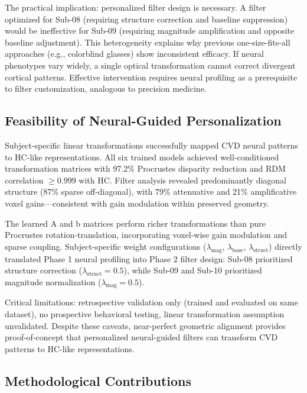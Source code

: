 \documentclass[12pt,a4paper]{article}
\begin{document}
The practical implication: personalized filter design is necessary. A filter optimized for Sub-08 (requiring structure correction and baseline suppression) would be ineffective for Sub-09 (requiring magnitude amplification and opposite baseline adjustment). This heterogeneity explains why previous one-size-fits-all approaches (e.g., colorblind glasses) show inconsistent efficacy. If neural phenotypes vary widely, a single optical transformation cannot correct divergent cortical patterns. Effective intervention requires neural profiling as a prerequisite to filter customization, analogous to precision medicine.

\subsection{Feasibility of Neural-Guided Personalization}

Subject-specific linear transformations successfully mapped CVD neural patterns to HC-like representations. All six trained models achieved well-conditioned transformation matrices with 97.2\% Procrustes disparity reduction and RDM correlation $\geq 0.999$ with HC. Filter analysis revealed predominantly diagonal structure (87\% sparse off-diagonal), with 79\% attenuative and 21\% amplificative voxel gains—consistent with gain modulation within preserved geometry.

The learned A and b matrices perform richer transformations than pure Procrustes rotation-translation, incorporating voxel-wise gain modulation and sparse coupling. Subject-specific weight configurations ($\lambda_{\text{mag}}$, $\lambda_{\text{base}}$, $\lambda_{\text{struct}}$) directly translated Phase 1 neural profiling into Phase 2 filter design: Sub-08 prioritized structure correction ($\lambda_{\text{struct}} = 0.5$), while Sub-09 and Sub-10 prioritized magnitude normalization ($\lambda_{\text{mag}} = 0.5$).

Critical limitations: retrospective validation only (trained and evaluated on same dataset), no prospective behavioral testing, linear transformation assumption unvalidated. Despite these caveats, near-perfect geometric alignment provides proof-of-concept that personalized neural-guided filters can transform CVD patterns to HC-like representations.

\subsection{Methodological Contributions}
\end{document}
